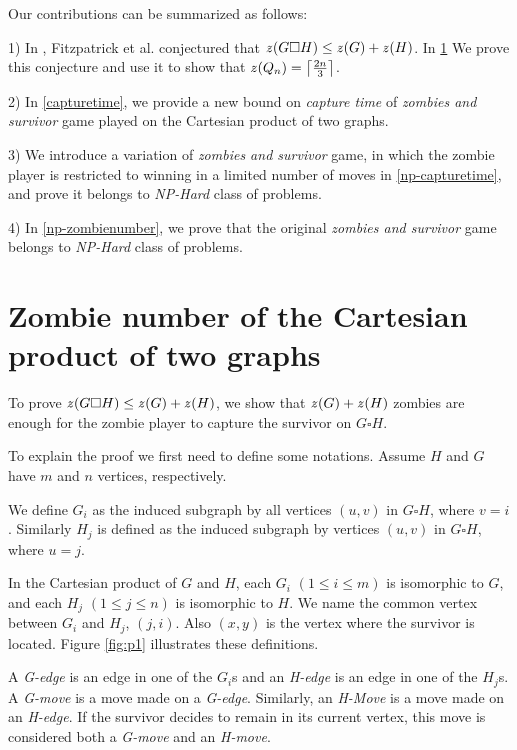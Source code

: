 \documentclass[1p]{elsarticle}
\DeclarePairedDelimiter\ceil{\lceil}{\rceil} \DeclarePairedDelimiter\floor{\lfloor}{\rfloor}
\newcommand{\zn}{\ooalign{$z$\cr\hfil\rule[.5ex]{.2em}{.08ex}\hfil\cr}}
\begin{document}
Our contributions can be summarized as follows:

1) In \cite{Fitz16}, Fitzpatrick et al. conjectured that $\zn(G \square H) \leq \zn(G) + \zn(H)$. In \ref{conj-proof} We prove this conjecture and
use it to show that $\zn(Q_n) = \ceil*{\frac{2n}{3}}$. 

2) In \ref{capturetime}, we provide a new bound on {\it capture time} of {\it zombies and survivor} game played on the Cartesian
product of two graphs. 

3) We introduce a variation of {\it zombies and survivor} game, in which the zombie player is restricted to winning in a
limited number of moves in \ref{np-capturetime}, and prove it belongs to {\it NP-Hard} class of problems.


4) In \ref{np-zombienumber}, we prove that the original {\it zombies and survivor} game belongs to {\it NP-Hard} class
of problems.


\section{Zombie number of the Cartesian product of two graphs}\label{conj-proof}

To prove $\zn(G \square H) \leq \zn(G) + \zn(H)$, we show that $\zn(G) + \zn(H)$ zombies are enough for the zombie player to
capture the survivor on $G \square H$.

To explain the proof we first need to define some notations. Assume $H$ and $G$ have $m$ and $n$ vertices,
respectively. 

We define $G_{i}$ as the induced subgraph by all vertices $(u,v)$ in $G \square H$, where $v=i$. Similarly $H_{j}$ is
defined as the induced subgraph by vertices $(u,v)$ in $G \square H$, where $u=j$.

In the Cartesian product of $G$ and $H$, each $G_{i}$ $(1 \leq i \leq m)$ is isomorphic to $G$, and each $H_{j}$ $(1
\leq j \leq n)$ is isomorphic to $H$. We name the common vertex between $G_{i}$ and $H_{j}$, $(j,i)$. Also $(x,y)$ is
the vertex where the survivor is located. Figure \ref{fig:p1} illustrates these definitions.

A {\it G-edge} is an edge in one of the $G_{i}$s and an {\it H-edge} is an edge in one of the $H_{j}$s. A {\it G-move}
is a move made on a {\it G-edge}. Similarly, an {\it H-Move} is a move made on an {\it H-edge}. If the survivor decides
to remain in its current vertex, this move is considered both a {\it G-move} and an {\it H-move}. 
\end{document}
